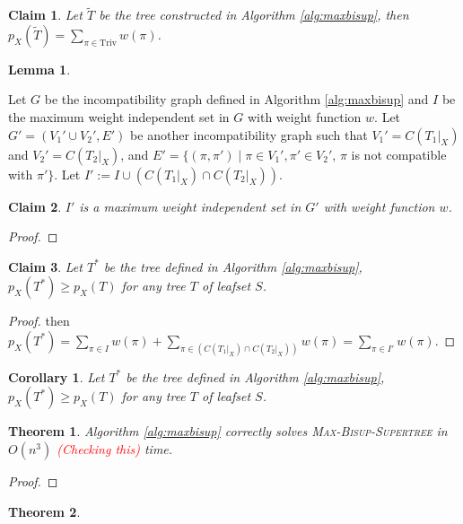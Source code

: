 \documentclass{article}
\newcommand{\note}[1]{\textcolor{red}{#1}}
\newcommand{\triv}{\mathrm{Triv}}
\newtheorem{theorem}{Theorem}
\newtheorem{lemma}{Lemma}
\newtheorem{claim}{Claim}
\newtheorem{corollary}{Corollary}
\begin{document}
\begin{claim}\label{claim:after_add_trivial}
    Let $\tilde{T}$ be the tree constructed in Algorithm \ref{alg:maxbisup}, then $p_X(\tilde{T}) = \sum_{\pi \in \triv} w(\pi)$. 
\end{claim}


\begin{lemma}\label{lem:refine_achieves_weight}
\end{lemma}

Let $G$ be the incompatibility graph defined in Algorithm \ref{alg:maxbisup} and $I$ be the maximum weight independent set in $G$ with weight function $w$. Let $G'= (V_1' \cup V_2',E')$ be another incompatibility graph such that $V_1' = C(T_1|_X)$ and $V_2' = C(T_2|_X)$, and $E' = \{(\pi, \pi') \mid \pi \in V_1', \pi' \in V_2'$, $\pi$ is not compatible with $\pi'\}$.  Let $I' := I \cup (C(T_1|_X )\cap C(T_2|_X))$.


\begin{claim}\label{claim:independent_sets_equivalence}
    $I'$ is a maximum weight independent set in $G'$ with weight function $w$. 
\end{claim}
\begin{proof}
\end{proof}

\begin{claim}\label{claim:after_add_all_bipars}
    Let $T^*$ be the tree defined in Algorithm \ref{alg:maxbisup}, $p_X(T^*) \ge p_X(T)$ for any tree $T$ of leafset $S$.
\end{claim}
\begin{proof}
then $p_X(T^*)= \sum_{\pi \in I} w(\pi) + \sum_{\pi \in (C(T_1|_X )\cap C(T_2|_X))} w(\pi) = \sum_{\pi \in I'}w(\pi)$.
\end{proof}


\begin{corollary}\label{cor:maximization}
    Let $T^*$ be the tree defined in Algorithm \ref{alg:maxbisup}, $p_X(T^*) \ge p_X(T)$ for any tree $T$ of leafset $S$.
\end{corollary}

\begin{theorem}\label{thm:correctness_alg}
Algorithm \ref{alg:maxbisup} correctly solves \textsc{Max-Bisup-Supertree} in $O(n^3)$ \note{(Checking this)} time.
\end{theorem}
\begin{proof}
\end{proof}

\begin{theorem}\label{thm:hardness}
\end{theorem}
\end{document}
